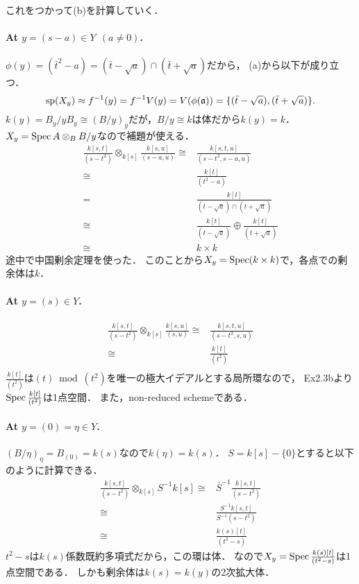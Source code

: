 \documentclass[a4paper]{jsarticle}
\begin{document}
    これをつかって(b)を計算していく．
    \paragraph{At $y=(s-a) \in Y ~~(a \neq 0)$.}
    $\phi(y)=(\bar{t}^2-a)=(\bar{t}-\sqrt{a}) \cap (\bar{t}+\sqrt{a})$だから，
    (a)から以下が成り立つ．
    \[
        \operatorname{sp}(X_y) \approx
        f^{-1}(y)=f^{-1}V(y)=V(\phi(\mathfrak{a}))=\{ (\bar{t}-\sqrt{a}), (\bar{t}+\sqrt{a}) \}.
    \]
    $k(y)=B_y/yB_y \cong (B/y)_{\bar{y}}$だが，$B/y \cong k$は体だから$k(y)=k$．
    $X_y=\operatorname{Spec} A \otimes_B B/y$なので補題が使える．
    \begin{align*}
        \frac{k[s,t]}{(s-t^2)} \otimes_{k[s]} \frac{k[s,u]}{(s-a,u)}
        \cong& \frac{k[s,t,u]}{(s-t^2, s-a, u)} \\
        \cong& \frac{k[t]}{(t^2-a)} \\
        =& \frac{k[t]}{(t-\sqrt{a}) \cap (t+\sqrt{a})} \\
        \cong& \frac{k[t]}{(t-\sqrt{a})} \oplus \frac{k[t]}{(t+\sqrt{a})} \\
        \cong& k \times k
    \end{align*}
    途中で中国剰余定理を使った．
    このことから$X_y=\operatorname{Spec} (k \times k)$で，各点での剰余体は$k$．

    \paragraph{At $y=(s) \in Y$.}
    \begin{align*}
        \frac{k[s,t]}{(s-t^2)} \otimes_{k[s]} \frac{k[s,u]}{(s,u)}
        \cong& \frac{k[s,t,u]}{(s-t^2, s, u)} \\
        \cong& \frac{k[t]}{(t^2)} \\
    \end{align*}
    $\frac{k[t]}{(t^2)}$は$(t) \bmod (t^2)$を唯一の極大イデアルとする局所環なので，
    Ex2.3bより$\operatorname{Spec} \frac{k[t]}{(t^2)}$は1点空間．
    また，non-reduced schemeである．

    \paragraph{At $y=(0)=\eta \in Y$.}
    $(B/\eta)_{\eta}=B_{(0)}=k(s)$なので$k(\eta)=k(s)$．
    $S=k[s]-\{0\}$とすると以下のように計算できる．
    \begin{align*}
        \frac{k[s,t]}{(s-t^2)} \otimes_{k[s]} S^{-1}k[s]
        \cong& \bar{S}^{-1} \frac{k[s,t]}{(s-t^2)} \\
        \cong& \frac{S^{-1}k[s,t]}{S^{-1} (s-t^2)} \\
        \cong& \frac{k(s)[t]}{(t^2-s)}
    \end{align*}
    $t^2-s$は$k(s)$係数既約多項式だから，この環は体．
    なので$X_y=\operatorname{Spec} \frac{k(s)[t]}{(t^2-s)}$は1点空間である．
    しかも剰余体は$k(s)=k(y)$の2次拡大体．
\end{document}
